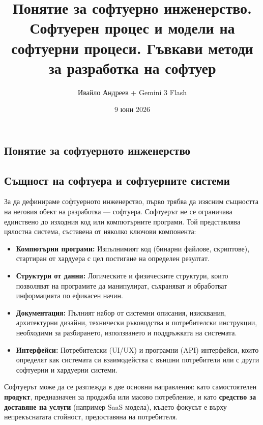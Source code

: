 \documentclass{scrartcl}
\title{Понятие за софтуерно инженерство. Софтуерен процес и модели на софтуерни процеси. Гъвкави методи за разработка на софтуер}
\author{Ивайло Андреев + Gemini 3 Flash}
\date{9 юни 2026}
\begin{document}
\maketitle

\tableofcontents

\newpage

\begin{FlushLeft}

\section{Понятие за софтуерното инженерство}

\subsection{Същност на софтуера и софтуерните системи}
За да дефинираме софтуерното инженерство, първо трябва да изясним същността на неговия обект на разработка — софтуера. Софтуерът не се ограничава единствено до изходния код или компютърните програми. Той представлява цялостна система, съставена от няколко ключови компонента:
\begin{itemize}
    \item \textbf{Компютърни програми:} Изпълнимият код (бинарни файлове, скриптове), стартиран от хардуера с цел постигане на определен резултат.
    \item \textbf{Структури от данни:} Логическите и физическите структури, които позволяват на програмите да манипулират, съхраняват и обработват информацията по ефикасен начин.
    \item \textbf{Документация:} Пълният набор от системни описания, изисквания, архитектурни дизайни, технически ръководства и потребителски инструкции, необходими за разбирането, използването и поддръжката на системата.
    \item \textbf{Интерфейси:} Потребителски (UI/UX) и програмни (API) интерфейси, които определят как системата си взаимодейства с външни потребители или с други софтуерни и хардуерни системи.
\end{itemize}

Софтуерът може да се разглежда в две основни направления: като самостоятелен \textbf{продукт}, предназначен за продажба или масово потребление, и като \textbf{средство за доставяне на услуги} (например SaaS модела), където фокусът е върху непрекъснатата стойност, предоставяна на потребителя.


\end{FlushLeft}
\end{document}
